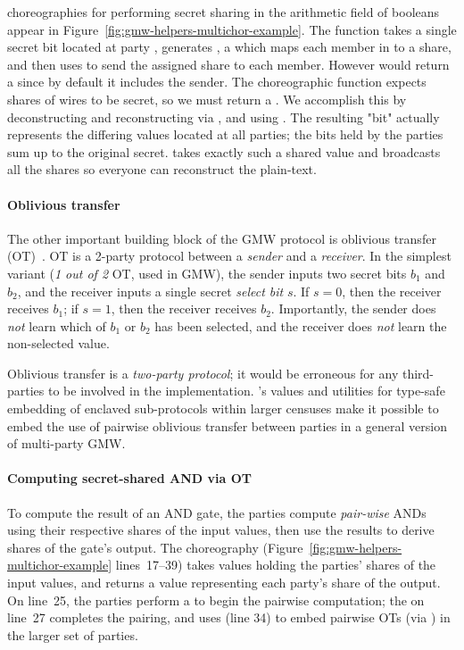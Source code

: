 \MultiChor choreographies for performing secret sharing in the arithmetic field of booleans appear in Figure~\ref{fig:gmw-helpers-multichor-example}. The function  takes a single secret bit located at party , generates ,
a  which maps each member in  to a share,
and then uses  to send the assigned share to each member.
However  would return a  since by default it includes the sender.
The choreographic function  expects shares of wires to be secret,
so we must return a .
We accomplish this by deconstructing and reconstructing via ,
and using .
The resulting  "bit" actually represents the differing values located at all parties;
the bits held by the parties sum up to the original secret.
 takes exactly such a shared value and broadcasts
all the shares so everyone can reconstruct the plain-text.

\paragraph{Oblivious transfer}
The other important building block of the GMW protocol is oblivious transfer (OT)~\cite{naor2001efficient}.
OT is a 2-party protocol between a \emph{sender} and a \emph{receiver}.
In the simplest variant (\emph{1 out of 2} OT, used in GMW), the sender inputs two secret bits $b_1$ and $b_2$,
and the receiver inputs a single secret \emph{select bit} $s$.
If $s=0$, then the receiver receives $b_1$; if $s=1$, then the receiver receives $b_2$.
Importantly, the sender does \emph{not} learn which of $b_1$ or $b_2$ has been selected,
and the receiver does \emph{not} learn the non-selected value.

Oblivious transfer is a \emph{two-party protocol}; it would be erroneous for any third-parties to be involved in the implementation.
\MultiChor's  values and utilities for type-safe embedding of enclaved sub-protocols within larger censuses
make it possible to embed the use of pairwise oblivious transfer between parties in a general version of multi-party GMW.

\paragraph{Computing secret-shared AND via OT}
To compute the result of an AND gate, the parties compute \emph{pair-wise} ANDs using their respective shares of the input values,
then use the results to derive shares of the gate's output.
The  choreography (Figure~\ref{fig:gmw-helpers-multichor-example} lines~17--39)
takes  values holding the parties' shares of the input values,
and returns a  value representing each party's share of the output.
On line~25, the parties perform a  to begin the pairwise computation;
the  on line~27 completes the pairing,
and uses  (line 34) to embed pairwise OTs (via ) in the larger set of parties.

